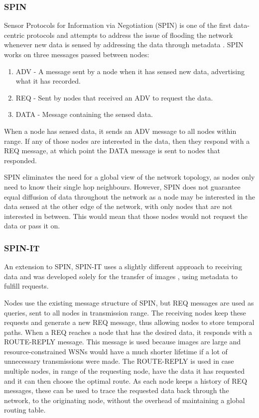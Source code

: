 \subsubsection{SPIN}
	Sensor Protocols for Information via Negotiation (SPIN)  is one of the first data-centric protocols and attempts to address the issue of flooding the network whenever new data is sensed by addressing the data through metadata \cite{Heinzelman1999}. SPIN works on three messages passed between nodes:
	\begin{enumerate}
		\item ADV - A message sent by a node when it has sensed new data, advertising what it has recorded.
		\item REQ - Sent by nodes that received an ADV to request the data.
		\item DATA - Message containing the sensed data.
	\end{enumerate}

When a node has sensed data, it sends an ADV message to all nodes within range. If any of those nodes are interested in the data, then they respond with a REQ message, at which point the DATA message is sent to nodes that responded.

SPIN eliminates the need for a global view of the network topology, as nodes only need to know their single hop neighbours. However, SPIN does not guarantee equal diffusion of data throughout the network as a node may be interested in the data sensed at the other edge of the network, with only nodes that are not interested in between. This would mean that those nodes would not request the data or pass it on.

\subsubsection{SPIN-IT}
	An extension to SPIN, SPIN-IT  uses a slightly different approach to receiving data and was developed solely for the transfer of images \cite{Woodrow2002}, using metadata to fulfill requests.
	
Nodes use the existing message structure of SPIN, but REQ messages are used as queries, sent to all nodes in transmission range. The receiving nodes keep these requests and generate a new REQ message, thus allowing nodes to store temporal paths. When a REQ reaches a node that has the desired data, it responds with a ROUTE-REPLY message. This message is used because images are large and resource-constrained WSNs would have a much shorter lifetime if a lot of unnecessary transmissions were made. The ROUTE-REPLY is used in case multiple nodes, in range of the requesting node, have the data it has requested and it can then choose the optimal route. As each node keeps a history of REQ messages, these can be used to trace the requested data back through the network, to the originating node, without the overhead of maintaining a global routing table.

